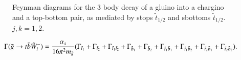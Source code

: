 \documentclass[final,3p,times,pdflatex]{elsarticle}
\begin{document}
\begin{figure}
  \caption{Feynman diagrams for the 3 body decay of a gluino into a chargino and a top-bottom pair, as mediated by stops $\tilde{t}_{1/2}$ and sbottoms $\tilde{t}_{1/2}$. $j,k=1,2$.} \label{gcharqqpdiag}
\end{figure} 
\begin{equation} \label{gchqqp}
\Gamma(\tilde{g} \rightarrow t \bar{b} \tilde{W}_i^-) = {\alpha_s \over 16 \pi^2 m_{\tilde{g}}} (\Gamma_{\tilde{t}_1} + \Gamma_{\tilde{t}_2} + \Gamma_{\tilde{t}_1 \tilde{t}_2} + \Gamma_{\tilde{b}_1} + \Gamma_{\tilde{b}_2} + \Gamma_{\tilde{t}_1 \tilde{b}_1} + \Gamma_{\tilde{t}_1 \tilde{b}_2} + \Gamma_{\tilde{t}_2 \tilde{b}_1} + \Gamma_{\tilde{t}_2 \tilde{b}_2}).
\end{equation}
\end{document}
